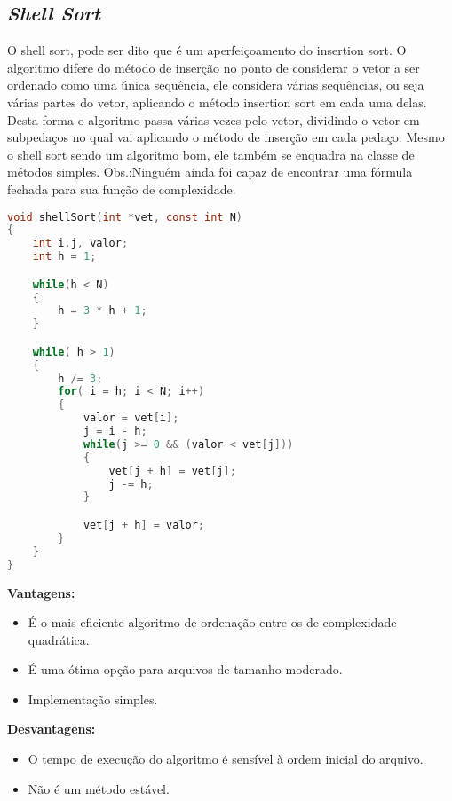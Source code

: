 \documentclass[
	12pt,				%
	oneside,			%
	a4paper,			%
	english,			%
	brazil,				%
	]{article}
\begin{document}
\subsection{\textit{Shell Sort}}
O shell sort, pode ser dito que é um aperfeiçoamento do insertion sort. O algoritmo difere do método de inserção no ponto de considerar o vetor a ser ordenado 
como uma única sequência, ele considera várias sequências, ou seja várias partes do vetor, aplicando o método insertion sort em cada uma delas. Desta forma o 
algoritmo passa várias vezes pelo vetor, dividindo o vetor em subpedaços no qual vai aplicando o método de inserção em cada pedaço. Mesmo o shell sort sendo
um algoritmo bom, ele também se enquadra na classe de métodos simples.\cite{Shell} \cite{Shelll}
Obs.:Ninguém ainda foi capaz de encontrar uma fórmula fechada para sua função de complexidade.
\begin{lstlisting}[language=C, caption=Estrutura \textit{Shell}]
void shellSort(int *vet, const int N)
{
	int i,j, valor;
	int h = 1;

	while(h < N)
	{
		h = 3 * h + 1;
	}

	while( h > 1)
	{
		h /= 3;
		for( i = h; i < N; i++)
		{
			valor = vet[i];
			j = i - h;
			while(j >= 0 && (valor < vet[j]))
			{
				vet[j + h] = vet[j];
				j -= h;
			}

			vet[j + h] = valor;
		}
	}
}
\end{lstlisting}
\textbf{Vantagens:}
\begin{itemize}
 \item É o mais eficiente algoritmo de ordenação entre os de complexidade quadrática.
 \item É uma ótima opção para arquivos de tamanho moderado.
 \item Implementação simples.
\end{itemize}
\textbf{Desvantagens:}
\begin{itemize}
 \item O tempo de execução do algoritmo é sensível à ordem inicial do arquivo.
 \item Não é um método estável. 
\end{itemize}
  
\end{document}
